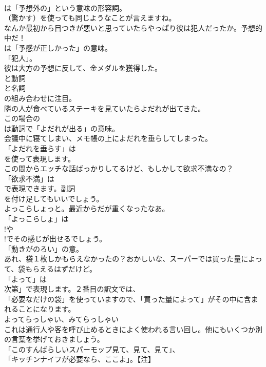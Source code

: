 \documentclass[8pt]{extreport}
\begin{document}
\begin{CJK}{UTF8}{min}
\\	は「予想外の」という意味の形容詞。
\\	（驚かす）を使っても同じようなことが言えますね。	
\\	なんか最初から目つきが悪いと思っていたらやっぱり彼は犯人だったか。予想的中だ！ 
\\	は「予感が正しかった」の意味。
\\	「犯人」。	
\\	彼は大方の予想に反して、金メダルを獲得した。 
\\	と動詞
\\	と名詞
\\	の組み合わせに注目。	
\\	隣の人が食べているステーキを見ていたらよだれが出てきた。 
\\	この場合の
\\	は動詞で「よだれが出る」の意味。	
\\	会議中に寝てしまい、メモ帳の上によだれを垂らしてしまった。 
\\	「よだれを垂らす」は
\\	を使って表現します。	
\\	この間からエッチな話ばっかりしてるけど、もしかして欲求不満なの？ 
\\	「欲求不満」は 
\\	で表現できます。副詞 
\\	を付け足してもいいでしょう。	
\\	よっこらしょっと。最近からだが重くなったなあ。 
\\	「よっこらしょ」は
\\	!や
\\	!でその感じが出せるでしょう。
\\	「動きがのろい」の意。	
\\	あれ、袋１枚しかもらえなかったの？おかしいな、スーパーでは買った量によって、袋もらえるはずだけど。 
\\	「よって」は
\\	次第」で表現します。２番目の訳文では、
\\	「必要なだけの袋」を使っていますので、「買った量によって」がその中に含まれることになります。	
\\	よってらっしゃい、みてらっしゃい 
\\	これは通行人や客を呼び止めるときによく使われる言い回し。他にもいくつか別の言葉を挙げておきましょう。
\\	「このすんばらしいスパーモップ見て、見て、見て」、
\\	「キッチンナイフが必要なら、ここよ」。【注】

\end{CJK}
\end{document}
